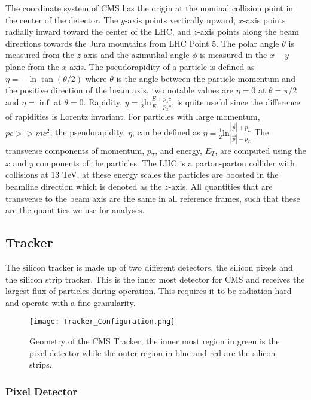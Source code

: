 The coordinate system of CMS has the origin at the nominal collision point in the center of the detector. The $y$-axis points vertically upward, $x$-axis points radially inward toward the center of the LHC, and $z$-axis points along the beam directions towards the Jura mountains from LHC Point 5. The polar angle $\theta$ is measured from the $z$-axis and the azimuthal angle $\phi$ is measured in the $x-y$ plane from the $x$-axis. The pseudorapidity of a particle is defined as $\eta=-\ln\tan(\theta/2)$ where $\theta$ is the angle between the particle momentum and the positive direction of the beam axis, two notable values are $\eta=0$ at $\theta=\pi/2$ and $\eta=\inf$ at $\theta=0$. Rapidity, $y=\frac{1}{2}\text{ln}\frac{E+p_z c}{E-p_z c}$, is quite useful since the difference of rapidities is Lorentz invariant. For particles with large momentum, $pc>>mc^2$, the pseudorapidity, $\eta$, can be defined as $\eta=\frac{1}{2}\text{ln}\frac{|\overrightarrow{p}|+p_L}{|\overrightarrow{p}|-p_L}$ The transverse components of momentum, $p_T$, and energy, $E_T$, are computed using the $x$ and $y$ components of the particles. The LHC is a parton-parton collider with collisions at 13 TeV, at these energy scales the particles are boosted in the beamline direction which is denoted as the $z$-axis. All quantities that are transverse to the beam axis are the same in all reference frames, such that these are the quantities we use for analyses. 

\subsection{Tracker}
\label{sec:Tracker}

The silicon tracker is made up of two different detectors, the silicon pixels and the silicon strip tracker. This is the inner most detector for CMS and receives the largest flux of particles during operation. This requires it to be radiation hard and operate with a fine granularity. 

\begin{figure}
 	\centering
	\texttt{[image: Tracker\_Configuration.png]}
 	\caption[CMS Tracker Geometry]{Geometry of the CMS Tracker, the inner most region in green is the pixel detector while the outer region in blue and red are the silicon strips.}
 	\label{CMSTracker} 
\end{figure}

\subsubsection{Pixel Detector}
\label{subsec:Pixel}

